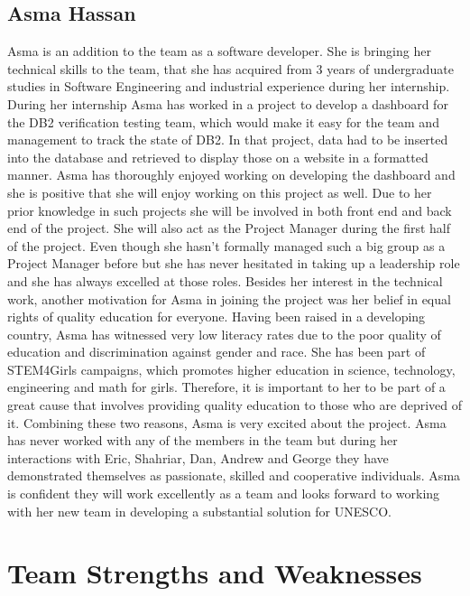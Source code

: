 \documentclass[11pt]{article}
\begin{document}
\subsection{\textbf{Asma Hassan}}
Asma is an addition to the team as a software developer. She is bringing her technical skills to the team, that she has acquired from 3 years of undergraduate studies in Software Engineering and industrial experience during her internship. During her internship Asma has worked in a project to develop a dashboard for the DB2 verification testing team, which would make it easy for the team and management to track the state of DB2. In that project, data had to be inserted into the database and retrieved to display those on a website in a formatted manner. Asma has thoroughly enjoyed working on developing the dashboard and she is positive that she will enjoy working on this project as well. Due to her prior knowledge in such projects she will be involved in both front end and back end of the project. She will also act as the Project Manager during the first half of the project. Even though she hasn't formally managed such a big group as a Project Manager before but she has never hesitated in taking up a leadership role and she has always excelled at those roles. Besides her interest in the technical work, another motivation for Asma in joining the project was her belief in equal rights of quality education for everyone. Having been raised in a developing country, Asma has witnessed very low literacy rates due to the poor quality of education and discrimination against gender and race. She has been part of STEM4Girls campaigns, which promotes higher education in science, technology, engineering and math for girls. Therefore, it is important to her to be part of a great cause that involves providing quality education to those who are deprived of it. Combining these two reasons, Asma is very excited about the project. Asma has never worked with any of the members in the team but during her interactions with Eric, Shahriar, Dan, Andrew and George they have demonstrated themselves as passionate, skilled and cooperative individuals. Asma is confident they will work excellently as a team and looks forward to working with her new team in developing a substantial solution for UNESCO. \\

\newpage

\section{Team Strengths and Weaknesses}
\end{document}

